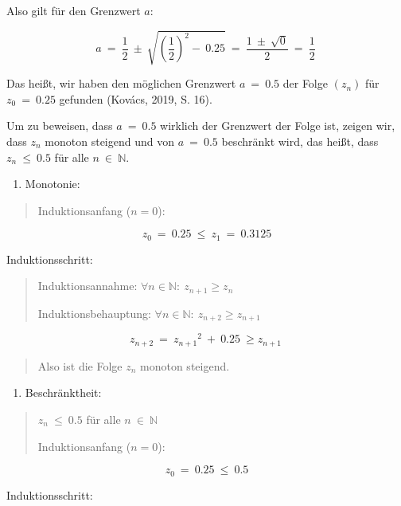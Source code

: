 \documentclass[a4paper, 12pt]{book}
\begin{document}
\begin{longtable}[]
\begin{minipage}[b]{\linewidth}
Also gilt für den Grenzwert \(a\):

\[a\  = \ \frac{1}{2}\  \pm \ \sqrt{\left( \frac{1}{2} \right)^{2} - \ 0.25}\  = \ \frac{1\  \pm \ \sqrt{0}}{2}\  = \ \frac{1}{2}\ \]

Das heißt, wir haben den möglichen Grenzwert \(a\  = \ 0.5\) der Folge
\(\left( z_{n} \right)\) für \(z_{0}\  = \ 0.25\) gefunden (Kovács,
2019, S. 16).

Um zu beweisen, dass \(a\  = \ 0.5\) wirklich der Grenzwert der Folge
ist, zeigen wir, dass \(z_{n}\) monoton steigend und von \(a\  = \ 0.5\)
beschränkt wird, das heißt, dass \(z_{n}\  \leq \ 0.5\) für alle
\(n\mathbb{\  \in \ N}\).

\begin{enumerate}
\def\labelenumi{\arabic{enumi})}
\item
  Monotonie:
\end{enumerate}

\begin{quote}
Induktionsanfang (\(n = 0\)):
\end{quote}

\[z_{0}\  = \ 0.25\  \leq \ z_{1}\  = \ 0.3125\]

Induktionsschritt:

\begin{quote}
Induktionsannahme: \(\forall n \in \mathbb{N:\ }z_{n + 1} \geq z_{n}\)

Induktionsbehauptung:
\(\forall n \in \mathbb{N:\ }z_{n + 2} \geq z_{n + 1}\)
\end{quote}

\[z_{n + 2}\  = \ {z_{n + 1}}^{2}\  + \ 0.25\  \geq z_{n + 1}\ \]

\begin{quote}
Also ist die Folge \(z_{n}\) monoton steigend.
\end{quote}

\begin{enumerate}
\def\labelenumi{\arabic{enumi})}
\setcounter{enumi}{1}
\item
  Beschränktheit:
\end{enumerate}

\begin{quote}
\(z_{n}\  \leq \ 0.5\) für alle \(n\mathbb{\  \in \ N}\)

Induktionsanfang (\(n = 0\)):
\end{quote}

\[z_{0}\  = \ 0.25\  \leq \ 0.5\]

Induktionsschritt:


\end{minipage}
\end{longtable}
\end{document}
